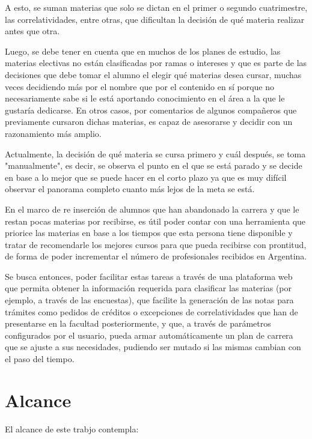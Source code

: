 \documentclass[a4paper]{article}
\begin{document}
A esto, se suman materias que solo se dictan en el primer o segundo cuatrimestre, las correlatividades, entre otras, que dificultan la decisión de qué materia realizar antes que otra.

Luego, se debe tener en cuenta que en muchos de los planes de estudio, las materias electivas no están clasificadas por ramas o intereses y que es parte de las decisiones que debe tomar el alumno el elegir qué materias desea cursar, muchas veces decidiendo más por el nombre que por el contenido en sí porque no necesariamente sabe si le está aportando conocimiento en el área a la que le gustaría dedicarse. En otros casos, por comentarios de algunos compañeros que previamente cursaron dichas materias, es capaz de asesorarse y decidir con un razonamiento más amplio.

Actualmente, la decisión de qué materia se cursa primero y cuál después, se toma "manualmente", es decir, se observa el punto en el que se está parado y se decide en base a lo mejor que se puede hacer en el corto plazo ya que es muy difícil observar el panorama completo cuanto más lejos de la meta se está.

En el marco de re inserción de alumnos que han abandonado la carrera y que le restan pocas materias por recibirse, es útil poder contar con una herramienta que priorice las materias en base a los tiempos que esta persona tiene disponible y tratar de recomendarle los mejores cursos para que pueda recibirse con prontitud, de forma de poder incrementar el número de profesionales recibidos en Argentina.

Se busca entonces, poder facilitar estas tareas a través de una plataforma web que permita obtener la información requerida para clasificar las materias (por ejemplo, a través de las encuestas), que facilite la generación de las notas para trámites como pedidos de créditos o excepciones de correlatividades que han de presentarse en la facultad posteriormente, y que, a través de parámetros configurados por el usuario, pueda armar automáticamente un plan de carrera que se ajuste a sus necesidades, pudiendo ser mutado si las mismas cambian con el paso del tiempo.

\section{Alcance}

El alcance de este trabjo contempla:
\end{document}
